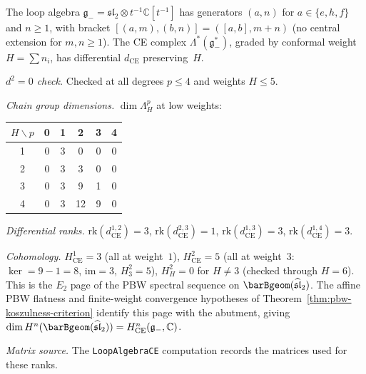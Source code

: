 \begin{computation}
\label{comp:sl2-ce-verification}
\ClaimStatusProvedHere
{}

The loop algebra
$\mathfrak{g}_- = \mathfrak{sl}_2 \otimes t^{-1}\mathbb{C}[t^{-1}]$
has generators $(a, n)$ for $a \in \{e, h, f\}$ and $n \geq 1$,
with bracket
$[(a, m), (b, n)] = ([a, b], m + n)$
(no central extension for $m, n \geq 1$).
The CE complex $\Lambda^*(\mathfrak{g}_-^*)$,
graded by conformal weight $H = \sum n_i$,
has differential $d_{\mathrm{CE}}$ preserving~$H$.

\emph{$d^2 = 0$ check.}
Checked at all degrees $p \leq 4$ and weights $H \leq 5$.

\emph{Chain group dimensions.}
$\dim \Lambda^p_H$ at low weights:
\begin{center}
\renewcommand{\arraystretch}{1.1}
\begin{tabular}{c|ccccc}
$H \backslash p$ & 0 & 1 & 2 & 3 & 4 \\
\hline
1 & 0 & 3 & 0 & 0 & 0 \\
2 & 0 & 3 & 3 & 0 & 0 \\
3 & 0 & 3 & 9 & 1 & 0 \\
4 & 0 & 3 & 12 & 9 & 0
\end{tabular}
\end{center}

\emph{Differential ranks.}
$\mathrm{rk}(d^{1,2}_{\mathrm{CE}}) = 3$,
$\mathrm{rk}(d^{2,3}_{\mathrm{CE}}) = 1$,
$\mathrm{rk}(d^{1,3}_{\mathrm{CE}}) = 3$,
$\mathrm{rk}(d^{1,4}_{\mathrm{CE}}) = 3$.

\emph{Cohomology.}
$H^1_{\mathrm{CE}} = 3$ (all at weight~$1$),
$H^2_{\mathrm{CE}} = 5$ (all at weight~$3$:
$\ker = 9 - 1 = 8$, $\mathrm{im} = 3$, $H^2_3 = 5$),
$H^2_H = 0$ for $H \neq 3$ (checked through $H = 6$).
This is the $E_2$ page of the PBW spectral
sequence on $\barBgeom(\widehat{\mathfrak{sl}}_2)$.  The affine PBW
flatness and finite-weight convergence hypotheses of
Theorem~\ref{thm:pbw-koszulness-criterion} identify this page with
the abutment, giving
$\dim H^n(\barBgeom(\widehat{\mathfrak{sl}}_2))
= H^n_{\mathrm{CE}}(\mathfrak{g}_-, \mathbb{C})$.

\emph{Matrix source.}
The \texttt{LoopAlgebraCE} computation records the matrices used for
these ranks.
\end{computation}

